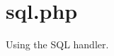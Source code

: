 \hypertarget{sql_8php-example}{
\section{sql.php}
}
Using the SQL handler.


\begin{DoxyCodeInclude}
\end{DoxyCodeInclude}
 